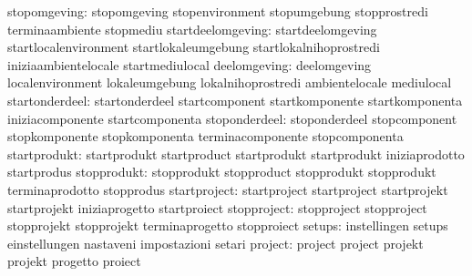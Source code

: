                     stopomgeving: stopomgeving                     stopenvironment
                                  stopumgebung                     stopprostredi
                                  terminaambiente                  stopmediu
               startdeelomgeving: startdeelomgeving                startlocalenvironment
                                  startlokaleumgebung              startlokalnihoprostredi
                                  iniziaambientelocale             startmediulocal
                    deelomgeving: deelomgeving                     localenvironment
                                  lokaleumgebung                   lokalnihoprostredi
                                  ambientelocale                   mediulocal
                  startonderdeel: startonderdeel                   startcomponent
                                  startkomponente                  startkomponenta
                                  iniziacomponente                 startcomponenta
                   stoponderdeel: stoponderdeel                    stopcomponent
                                  stopkomponente                   stopkomponenta
                                  terminacomponente                stopcomponenta
                    startprodukt: startprodukt                     startproduct
                                  startprodukt                     startprodukt
                                  iniziaprodotto                   startprodus
                     stopprodukt: stopprodukt                      stopproduct
                                  stopprodukt                      stopprodukt
                                  terminaprodotto                  stopprodus
                    startproject: startproject                     startproject
                                  startprojekt                     startprojekt
                                  iniziaprogetto                   startproiect
                     stopproject: stopproject                      stopproject
                                  stopprojekt                      stopprojekt
                                  terminaprogetto                  stopproiect
                          setups: instellingen                     setups
                                  einstellungen                    nastaveni
                                  impostazioni                     setari
                         project: project                          project
                                  projekt                          projekt
                                  progetto                         proiect
